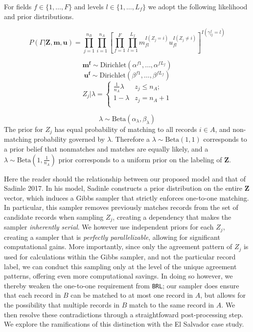 \documentclass[12pt,letterpaper]{article}
\newcommand{\1}[1]{\mathbb{I}\!\left[#1\right]} %
\begin{document}
For fields \(f \in \{1, \ldots, F\}\) and levels
\(l\in \{1, \ldots, L_f\}\) we adopt the following likelihood and prior
distributions.


$$P(\Gamma|\mathbf{Z}, \mathbf{m}, \mathbf{u}) = \prod_{j=1}^{n_B}  \prod_{i=1}^{n_A}\left[ \prod_{f=1}^{F}\prod_{l=1}^{L_f} m_{fl}^{I(Z_j = i)}u_{fl}^{I(Z_j \neq i)}\right]^{I(\gamma_{ij}^f = l)}$$

\[\mathbf{m^{f}} \sim \text{Dirichlet}(\alpha^{f1}, \ldots, \alpha^{fL_f})\]
\[\mathbf{u^{f}} \sim \text{Dirichlet}(\beta^{f1}, \ldots, \beta^{fL_f})\]
\[Z_j | \lambda =
\begin{cases} 
	\frac{1}{n_A}\lambda  & z_j \leq n_A; \\
	1-\lambda &  z_j  = n_A + 1 \\
\end{cases}\]

\[\lambda \sim \text{Beta}(\alpha_{\lambda}, \beta_{\lambda}) \] The
prior for \(Z_j\) has equal probability of matching to all records
\(i\in A\), and non-matching probability governed by \(\lambda\).
Therefore a \(\lambda \sim \text{Beta}(1, 1)\) corresponds to a prior
belief that nonmatches and matches are equally likely, and a
\(\lambda \sim \text{Beta}\left(1, \frac{1}{n_A}\right)\) prior
corresponds to a uniform prior on the labeling of \(\mathbf{Z}\).

Here the reader should the relationship between our proposed model and
that of Sadinle 2017. In his model, Sadinle constructs a prior
distribution on the entire \(\mathbf{Z}\) vector, which induces a Gibbs
sampler that strictly enforces one-to-one matching. In particular, this
sampler removes previously matches records from the set of candidate
records when sampling \(Z_j\), creating a dependency that makes the
sampler \emph{inherently serial}. We however use independent priors for
each \(Z_j\), creating a sampler that is \emph{perfectly parallelizable}, allowing for significant computational gains. More
importantly, since only the agreement pattern of \(Z_j\) is used for
calculations within the Gibbs sampler, and not the particular record
label, we can conduct this sampling only at the level of the unique
agreement patterns, offering even more computational savings. In doing
so however, we thereby weaken the one-to-one requirement from
\texttt{BRL}; our sampler does ensure that each record in \(B\) can be
matched to at most one record in \(A\), but allows for the possibility
that multiple records in \(B\) match to the same record in \(A\). We then resolve these contradictions through a straightfoward post-processing step. We
explore the ramifications of this distinction with the El Salvador case
study.
\end{document}
